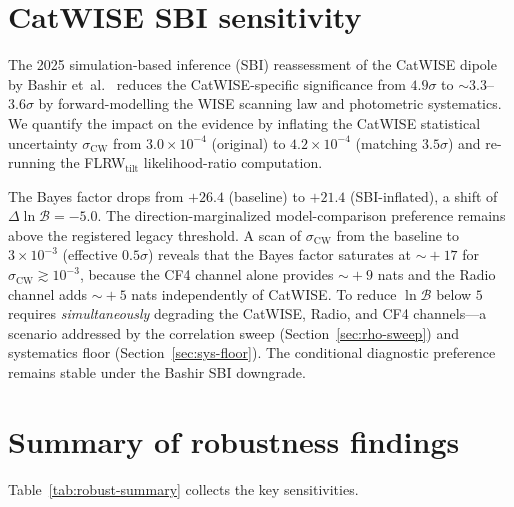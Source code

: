 \section{CatWISE SBI sensitivity}\label{sec:catwise-sbi}

The 2025 simulation-based inference (SBI) reassessment of the
CatWISE dipole by Bashir et~al.~\cite{Bashir2025} reduces the
CatWISE-specific significance from $4.9\sigma$ to
$\sim\!3.3$--$3.6\sigma$ by forward-modelling the WISE scanning
law and photometric systematics.  We quantify the impact on the
evidence by inflating the CatWISE statistical uncertainty
$\sigma_{\mathrm{CW}}$ from $3.0 \times 10^{-4}$ (original) to
$4.2 \times 10^{-4}$ (matching $3.5\sigma$) and re-running the
FLRW$_{\mathrm{tilt}}$ likelihood-ratio computation.

The Bayes factor drops from $+26.4$ (baseline) to $+21.4$
(SBI-inflated), a shift of $\Delta\ln\mathcal{B} = -5.0$.  The
direction-marginalized model-comparison preference remains above
the registered legacy threshold.  A scan of
$\sigma_{\mathrm{CW}}$ from the baseline to $3 \times 10^{-3}$
(effective $0.5\sigma$) reveals that the Bayes factor saturates
at $\sim\!+17$ for $\sigma_{\mathrm{CW}} \gtrsim 10^{-3}$,
because the CF4 channel alone provides $\sim\!+9$ nats and the
Radio channel adds $\sim\!+5$ nats independently of CatWISE.
To reduce $\ln\mathcal{B}$ below $5$ requires
\emph{simultaneously} degrading the CatWISE, Radio, and CF4
channels---a scenario addressed by the correlation sweep
(Section~\ref{sec:rho-sweep}) and systematics floor
(Section~\ref{sec:sys-floor}).  The conditional diagnostic
preference remains stable under the Bashir SBI downgrade.


\section{Summary of robustness findings}
\label{sec:robust-summary}

Table~\ref{tab:robust-summary} collects the key sensitivities.

